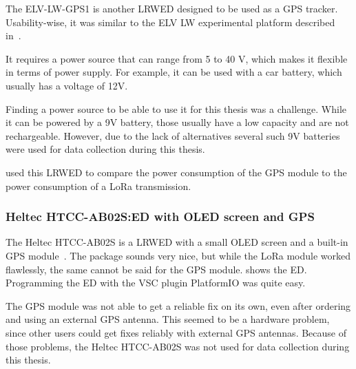 The ELV-LW-GPS1 is another \acl{LRWED} designed to be used as a \ac{GPS} tracker.
Usability-wise, it was similar to the ELV LW experimental platform described in~.

It requires a power source that can range from 5 to 40 V, which makes it flexible in terms of power supply.
For example, it can be used with a car battery, which usually has a voltage of 12V.

Finding a power source to be able to use it for this thesis was a challenge.
While it can be powered by a 9V battery, those usually have a low capacity and are not rechargeable.
However, due to the lack of alternatives several such 9V batteries were used for data collection during this thesis.

 used this \acl{LRWED} to compare the power consumption of the \ac{GPS} module to the power consumption of a \ac{LoRa} transmission.

\subsubsection{Heltec HTCC-AB02S:\@ \acl{ED} with \acs{OLED} screen and \acs{GPS}}\label{subsubsec:heltec-htcc-ab02s}

The Heltec HTCC-AB02S is a \acl{LRWED} with a small OLED screen and a built-in \ac{GPS} module~\cite{heltec_automation_cubecell_2020}.
The package sounds very nice, but while the \ac{LoRa} module worked flawlessly, the same cannot be said for the \ac{GPS} module.
 shows the \acl{ED}.
Programming the \acl{ED} with the \ac{VSC} plugin PlatformIO was quite easy.

The \ac{GPS} module was not able to get a reliable fix on its own, even after ordering and using an external \ac{GPS} antenna.
This seemed to be a hardware problem, since other users could get fixes reliably with external \ac{GPS} antennas.
Because of those problems, the Heltec HTCC-AB02S was not used for data collection during this thesis.

